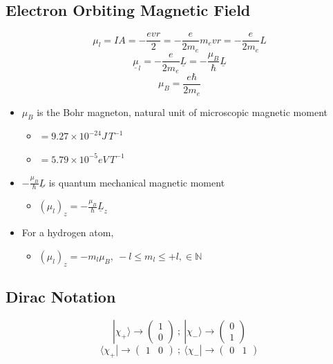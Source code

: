 \documentclass[a4paper,11pt,normalem]{article}
\begin{document}
\subsection{Electron Orbiting Magnetic Field}\label{electron-orbiting-magnetic-field}

\[
    \mu_l = IA = -\frac{evr}{2} = -\frac{e}{2m_e}m_e vr = -\frac{e}{2m_e}L \]
\[
    \underline{\mu}_l = -\frac{e}{2m_e}\underline{L} = -\frac{\mu_B}{\hbar}\underline{L} \]
\[
    \mu_B = \frac{e\hbar}{2m_e}
\]

\begin{itemize}
\item
  \(\mu_B\) is the Bohr magneton, natural unit of microscopic magnetic
  moment
  \begin{itemize}
  \item
    \(= 9.27 \times 10^{-24} J\,T^{-1}\)
  \item
    \(= 5.79 \times 10^{-5} eV \, T^{-1}\)
  \end{itemize}
\item
  \(-\frac{\mu_B}{\hbar}\underline{L}\) is quantum mechanical magnetic
  moment
  \begin{itemize}
  \item
    \((\mu_l)_{z} = -\frac{\mu_{B}}{\hbar}\underline{L}_z\)
  \end{itemize}
\item
  For a hydrogen atom,
  \begin{itemize}
  \item
    \((\mu_l)_{z} = -m_{l}\mu_B,~ -l \leq m_l \leq +l, \in \mathbb{N}\)
  \end{itemize}
\end{itemize}

\subsection{Dirac Notation}\label{dirac-notation}
\[
    |\chi_+ \rangle \to \begin{pmatrix} 1 \\ 0 \end{pmatrix} ~;~ |\chi_- \rangle \to \begin{pmatrix} 0 \\ 1 \end{pmatrix} \]
\[
    \langle \chi_+ | \to \begin{pmatrix} 1 & 0 \end{pmatrix} ~;~ \langle \chi_- | \to \begin{pmatrix} 0 & 1 \end{pmatrix}
\]
\end{document}
